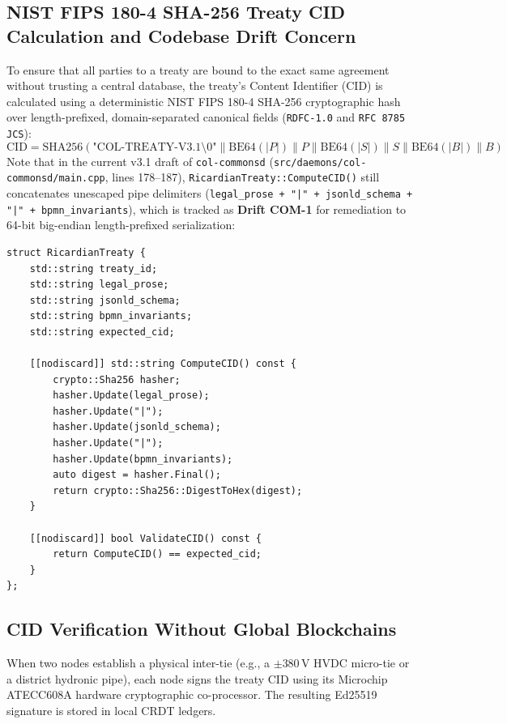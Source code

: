 \subsection{NIST FIPS 180-4 SHA-256 Treaty CID Calculation and Codebase Drift Concern}
To ensure that all parties to a treaty are bound to the exact same agreement without trusting a central database, the treaty's Content Identifier (CID) is calculated using a deterministic NIST FIPS 180-4 SHA-256 cryptographic hash over length-prefixed, domain-separated canonical fields (\texttt{RDFC-1.0} and \texttt{RFC 8785 JCS}):
\begin{equation}
\mathrm{CID} = \mathrm{SHA256}\left( \text{"COL-TREATY-V3.1\textbackslash 0"} \parallel \mathrm{BE64}(|P|) \parallel P \parallel \mathrm{BE64}(|S|) \parallel S \parallel \mathrm{BE64}(|B|) \parallel B \right)
\label{eq:ricardian_cid}
\end{equation}
Note that in the current v3.1 draft of \texttt{col-commonsd} (\texttt{src/daemons/col-commonsd/main.cpp}, lines 178--187), \texttt{RicardianTreaty::ComputeCID()} still concatenates unescaped pipe delimiters (\texttt{legal\_prose + "|" + jsonld\_schema + "|" + bpmn\_invariants}), which is tracked as \textbf{Drift COM-1} for remediation to 64-bit big-endian length-prefixed serialization:
\begin{verbatim}
struct RicardianTreaty {
    std::string treaty_id;
    std::string legal_prose;
    std::string jsonld_schema;
    std::string bpmn_invariants;
    std::string expected_cid;

    [[nodiscard]] std::string ComputeCID() const {
        crypto::Sha256 hasher;
        hasher.Update(legal_prose);
        hasher.Update("|");
        hasher.Update(jsonld_schema);
        hasher.Update("|");
        hasher.Update(bpmn_invariants);
        auto digest = hasher.Final();
        return crypto::Sha256::DigestToHex(digest);
    }

    [[nodiscard]] bool ValidateCID() const {
        return ComputeCID() == expected_cid;
    }
};
\end{verbatim}

\subsection{CID Verification Without Global Blockchains}
When two nodes establish a physical inter-tie (e.g., a $\pm 380\,\mathrm{V}$ HVDC micro-tie or a district hydronic pipe), each node signs the treaty CID using its Microchip ATECC608A hardware cryptographic co-processor. The resulting Ed25519 signature is stored in local CRDT ledgers. 

